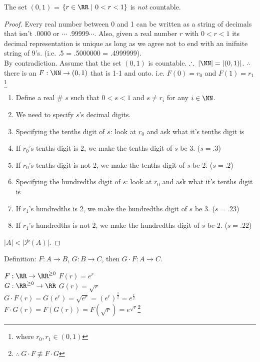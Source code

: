\begin{theorem}
The set $(0,1)$ = $\left\{ r\in\RR\ |\ 0<r<1 \right\}$ is \emph{not} countable.
\end{theorem}
\begin{proof}
Every real number between 0 and 1 can be written as a string of decimals that isn't .0000 or $\cdots$ .99999$\cdots$. Also, given a real number $r$ with $0<r<1$ its decimal representation is unique as long as we agree not to end with an inifnite string of 9's. (i.e. .5 = .5000000 = .4999999). \\ By contradiction. Assume that the set $(0,1)$ is countable. $\therefore\ |\NN|=|(0,1)|$. $\therefore$ there is an $F:\NN \to (0,1)$ that is 1-1 and onto. i.e. $F(0)=r_0$ and $F(1)=r_1$\footnote{where $r_0,r_1\in(0,1)$}
\begin{enumerate}
\item Define a real \# $s$ such that $0<s<1$ and $s\neq r_i$ for any $i\in\NN$.
\item We need to specify $s$'s decimal digits.
\item Specifying the tenths digit of  $s$: look at $r_0$ and ask what it's tenths digit is
\item If $r_0$'s tenths digit is 2, we make the tenths digit of $s$ be 3. ($s=.3$)
\item If $r_0$'s tenths digit is not 2, we make the tenths digit of $s$ be 2. ($s=.2$)
\item Specifying the hundredths digit of  $s$: look at $r_0$ and ask what it's tenths digit is
\item If $r_1$'s hundredths is 2, we make the hundredths digit of $s$ be 3. ($s=.23$)
\item If $r_1$'s hundredths is not 2, we make the hundredths digit of $s$ be 2. ($s=.22$)
\end{enumerate}
$|A| < |\mathcal{P}(A)|$.
\end{proof}
\noindent
Definition: $F:A\to B$, $G:B\to C$, then $G\cdot F:A\to C$.
\begin{example}
$F:\RR\to\RR^{\ge 0}$ $F(r)=e^r$ \\
$G:\RR^{\ge 0}\to\RR$ $G(r)=\sqrt{r}$ \\
$G\cdot F(r) = G(e^r) = \sqrt{e^r} = (e^{r})^{\frac{1}{2}} = e^{\frac{r}{2}}$ \\
$F\cdot G(r) = F(G(r)) = F(\sqrt{r}) = e^{\sqrt{r}}$\footnote{$\therefore\ G\cdot F \not \equiv F \cdot G$}
\end{example}
